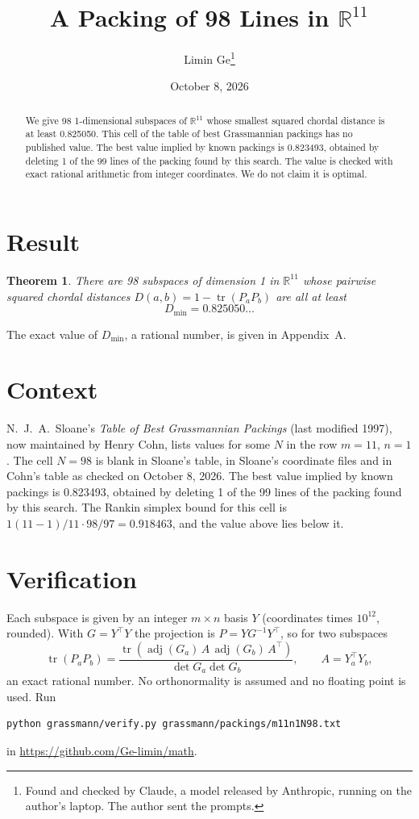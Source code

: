 \documentclass[11pt,a4paper]{article}
\title{A Packing of 98 Lines in $\mathbb{R}^{11}$}
\author{Limin Ge\thanks{Found and checked by Claude, a model released by Anthropic, running on the author's laptop. The author sent the prompts.}}
\date{October 8, 2026}
\newtheorem*{theorem}{Theorem}
\begin{document}
\maketitle
\begin{abstract}
We give 98 1-dimensional subspaces of $\mathbb{R}^{11}$ whose smallest squared chordal distance is at least 0.825050. This cell of the table of best Grassmannian packings has no published value. The best value implied by known packings is 0.823493, obtained by deleting 1 of the 99 lines of the packing found by this search. The value is checked with exact rational arithmetic from integer coordinates. We do not claim it is optimal.
\end{abstract}

\section{Result}
\begin{theorem}
There are 98 subspaces of dimension 1 in $\mathbb{R}^{11}$ whose pairwise squared chordal distances $D(a,b) = 1 - \operatorname{tr}(P_aP_b)$ are all at least
\[ D_{\min} = 0.825050\ldots \]
\end{theorem}
The exact value of $D_{\min}$, a rational number, is given in Appendix~A.


\section{Context}
N.~J.~A.~Sloane's \emph{Table of Best Grassmannian Packings} (last modified 1997), now maintained by Henry Cohn, lists values for some $N$ in the row $m=11$, $n=1$. The cell $N=98$ is blank in Sloane's table, in Sloane's coordinate files and in Cohn's table as checked on October 8, 2026. The best value implied by known packings is 0.823493, obtained by deleting 1 of the 99 lines of the packing found by this search. The Rankin simplex bound for this cell is $1(11-1)/11\cdot 98/97 = 0.918463$, and the value above lies below it.


\section{Verification}
Each subspace is given by an integer $m\times n$ basis $Y$ (coordinates times $10^{12}$, rounded). With $G=Y^\top Y$ the projection is $P=YG^{-1}Y^\top$, so for two subspaces
\[ \operatorname{tr}(P_aP_b)=\frac{\operatorname{tr}(\operatorname{adj}(G_a)\,A\,\operatorname{adj}(G_b)\,A^\top)}{\det G_a\det G_b},\qquad A=Y_a^\top Y_b, \]
an exact rational number. No orthonormality is assumed and no floating point is used. Run
\begin{verbatim}
python grassmann/verify.py grassmann/packings/m11n1N98.txt
\end{verbatim}
in \url{https://github.com/Ge-limin/math}.
\end{document}

